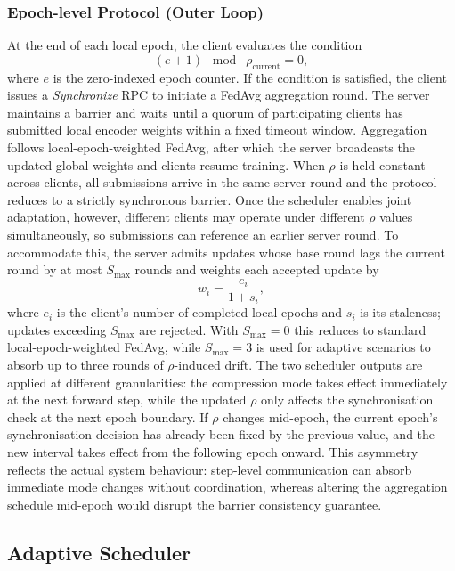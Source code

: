 \documentclass[conference]{IEEEtran}
\begin{document}
\subsubsection{Epoch-level Protocol (Outer Loop)}
At the end of each local epoch, the client evaluates the condition
\begin{equation}
    (e + 1)\;\bmod\;\rho_{\text{current}} = 0,
    \label{eq:sync_trigger}
\end{equation}
where $e$ is the zero-indexed epoch counter. If the condition is satisfied, the client issues a \textit{Synchronize} RPC to initiate a FedAvg aggregation round. The server maintains a barrier and waits until a quorum of participating clients has submitted local encoder weights within a fixed timeout window. Aggregation follows local-epoch-weighted FedAvg, after which the server broadcasts the updated global weights and clients resume training. When $\rho$ is held constant across clients, all submissions arrive in the same server round and the protocol reduces to a strictly synchronous barrier. Once the scheduler enables joint adaptation, however, different clients may operate under different $\rho$ values simultaneously, so submissions can reference an earlier server round. To accommodate this, the server admits updates whose base round lags the current round by at most $S_{\max}$ rounds and weights each accepted update by
\begin{equation}
    w_i = \frac{e_i}{1 + s_i},
    \label{eq:fedavg_weight}
\end{equation}
where $e_i$ is the client's number of completed local epochs and $s_i$ is its staleness; updates exceeding $S_{\max}$ are rejected. With $S_{\max}=0$ this reduces to standard local-epoch-weighted FedAvg, while $S_{\max}=3$ is used for adaptive scenarios to absorb up to three rounds of $\rho$-induced drift. The two scheduler outputs are applied at different granularities: the compression mode takes effect immediately at the next forward step, while the updated $\rho$ only affects the synchronisation check at the next epoch boundary. If $\rho$ changes mid-epoch, the current epoch's synchronisation decision has already been fixed by the previous value, and the new interval takes effect from the following epoch onward. This asymmetry reflects the actual system behaviour: step-level communication can absorb immediate mode changes without coordination, whereas altering the aggregation schedule mid-epoch would disrupt the barrier consistency guarantee.

\subsection{Adaptive Scheduler}
\label{subsec:scheduler}
\end{document}
